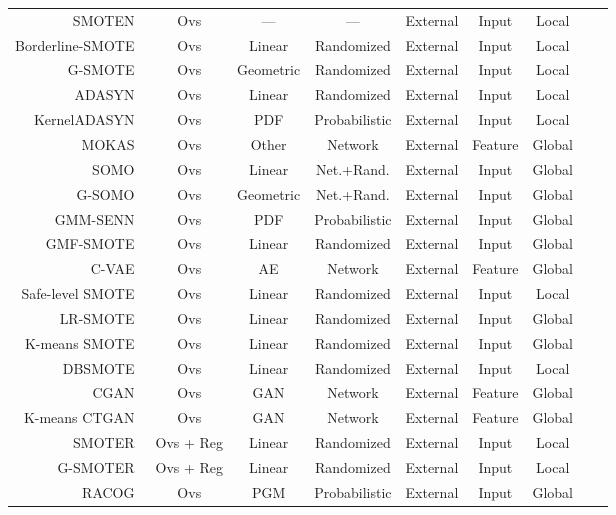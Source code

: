 \documentclass[parskip=full]{scrartcl}
\begin{document}
\begin{longtable}{rcccccccc}
    SMOTEN~\cite{chawla2002smote} & Ovs & --- & --- & External & Input & Local \\
    Borderline-SMOTE~\cite{han2005borderline} & Ovs & Linear & Randomized & External & Input & Local \\
    G-SMOTE~\cite{douzas2019geometric} & Ovs & Geometric & Randomized & External & Input & Local \\
    ADASYN~\cite{he2008adasyn} & Ovs & Linear & Randomized & External & Input & Local \\
    KernelADASYN~\cite{tang2015kerneladasyn} & Ovs & PDF & Probabilistic & External & Input & Local \\
    MOKAS~\cite{lin2017minority} & Ovs & Other & Network & External & Feature & Global \\
    SOMO~\cite{douzas2017self} & Ovs & Linear & Net.+Rand. & External & Input & Global \\
    G-SOMO~\cite{douzas2021g} & Ovs & Geometric & Net.+Rand. & External & Input & Global \\
    GMM-SENN~\cite{xing2022predict} & Ovs & PDF & Probabilistic & External & Input & Global \\
    GMF-SMOTE~\cite{xu2022synthetic} & Ovs & Linear & Randomized & External & Input & Global \\
    C-VAE~\cite{dai2019generative} & Ovs & AE & Network & External & Feature & Global \\
    Safe-level SMOTE~\cite{bunkhumpornpat2009safe} & Ovs & Linear & Randomized & External & Input & Local \\
    LR-SMOTE~\cite{liang2020lr} & Ovs & Linear & Randomized & External & Input & Global \\
    K-means SMOTE~\cite{douzas2018improving} & Ovs & Linear & Randomized & External & Input & Global\\
    DBSMOTE~\cite{bunkhumpornpat2012dbsmote} & Ovs & Linear & Randomized & External & Input & Local\\
    CGAN~\cite{douzas2018effective} & Ovs & GAN & Network & External & Feature & Global \\
    K-means CTGAN~\cite{an2021k} & Ovs & GAN & Network & External & Feature & Global \\
    SMOTER~\cite{torgo2013smote} & Ovs + Reg & Linear & Randomized & External & Input & Local \\
    G-SMOTER~\cite{camacho2022geometric} & Ovs + Reg & Linear & Randomized & External & Input & Local \\
    RACOG~\cite{das2014racog} & Ovs & PGM & Probabilistic & External & Input & Global \\

\end{longtable}
\end{document}
